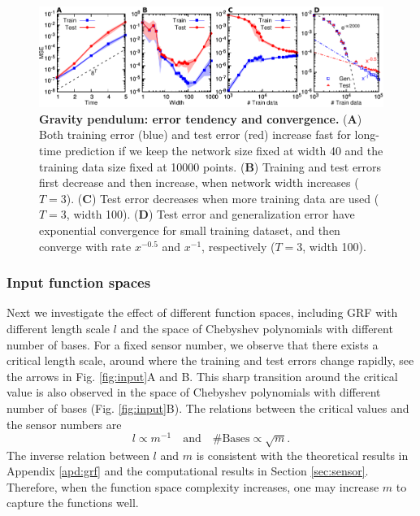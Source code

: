 \documentclass[11pt]{article}
\begin{document}
\begin{figure}[htbp]
\centering
\includegraphics{t.pdf}
\caption{\textbf{Gravity pendulum: error tendency and convergence.} (\textbf{A}) Both training error (blue) and test error (red) increase fast for long-time prediction if we keep the network size fixed at width 40 and the training data size fixed at 10000 points. (\textbf{B}) Training and test errors first decrease and then increase, when network width increases ($T=3$). (\textbf{C}) Test error decreases when more training data are used ($T=3$, width 100). (\textbf{D}) Test error and generalization error have exponential convergence for small training dataset, and then converge with rate $x^{-0.5}$ and $x^{-1}$, respectively ($T=3$, width 100).}
\label{fig:t}
\end{figure}

\subsubsection{Input function spaces}

Next we investigate the effect of different function spaces, including GRF with different length scale $l$ and the space of Chebyshev polynomials with different number of bases. For a fixed sensor number, we observe that there exists a critical length scale, around where the training and test errors change rapidly, see the arrows in Fig. \ref{fig:input}A and B. This sharp transition around the critical value is also observed in the space of Chebyshev polynomials with different number of bases (Fig. \ref{fig:input}B). The relations between the critical values and the sensor numbers are
\[ l \propto m^{-1} \quad \text{and} \quad \# \text{Bases} \propto \sqrt{m}. \]
The inverse relation between $l$ and $m$ is consistent with the theoretical results in Appendix \ref{apd:grf} and the computational results in Section \ref{sec:sensor}. Therefore, when the function space complexity increases, one may increase $m$ to capture the functions well.
\end{document}
